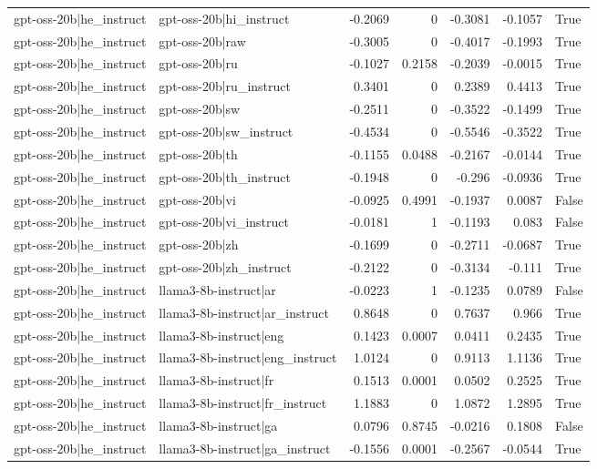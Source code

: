 \begin{table}
\begin{tabular}{l l r r r r l}
gpt-oss-20b|he_instruct & gpt-oss-20b|hi_instruct & -0.2069 & 0 & -0.3081 & -0.1057 & True \\
gpt-oss-20b|he_instruct & gpt-oss-20b|raw & -0.3005 & 0 & -0.4017 & -0.1993 & True \\
gpt-oss-20b|he_instruct & gpt-oss-20b|ru & -0.1027 & 0.2158 & -0.2039 & -0.0015 & True \\
gpt-oss-20b|he_instruct & gpt-oss-20b|ru_instruct & 0.3401 & 0 & 0.2389 & 0.4413 & True \\
gpt-oss-20b|he_instruct & gpt-oss-20b|sw & -0.2511 & 0 & -0.3522 & -0.1499 & True \\
gpt-oss-20b|he_instruct & gpt-oss-20b|sw_instruct & -0.4534 & 0 & -0.5546 & -0.3522 & True \\
gpt-oss-20b|he_instruct & gpt-oss-20b|th & -0.1155 & 0.0488 & -0.2167 & -0.0144 & True \\
gpt-oss-20b|he_instruct & gpt-oss-20b|th_instruct & -0.1948 & 0 & -0.296 & -0.0936 & True \\
gpt-oss-20b|he_instruct & gpt-oss-20b|vi & -0.0925 & 0.4991 & -0.1937 & 0.0087 & False \\
gpt-oss-20b|he_instruct & gpt-oss-20b|vi_instruct & -0.0181 & 1 & -0.1193 & 0.083 & False \\
gpt-oss-20b|he_instruct & gpt-oss-20b|zh & -0.1699 & 0 & -0.2711 & -0.0687 & True \\
gpt-oss-20b|he_instruct & gpt-oss-20b|zh_instruct & -0.2122 & 0 & -0.3134 & -0.111 & True \\
gpt-oss-20b|he_instruct & llama3-8b-instruct|ar & -0.0223 & 1 & -0.1235 & 0.0789 & False \\
gpt-oss-20b|he_instruct & llama3-8b-instruct|ar_instruct & 0.8648 & 0 & 0.7637 & 0.966 & True \\
gpt-oss-20b|he_instruct & llama3-8b-instruct|eng & 0.1423 & 0.0007 & 0.0411 & 0.2435 & True \\
gpt-oss-20b|he_instruct & llama3-8b-instruct|eng_instruct & 1.0124 & 0 & 0.9113 & 1.1136 & True \\
gpt-oss-20b|he_instruct & llama3-8b-instruct|fr & 0.1513 & 0.0001 & 0.0502 & 0.2525 & True \\
gpt-oss-20b|he_instruct & llama3-8b-instruct|fr_instruct & 1.1883 & 0 & 1.0872 & 1.2895 & True \\
gpt-oss-20b|he_instruct & llama3-8b-instruct|ga & 0.0796 & 0.8745 & -0.0216 & 0.1808 & False \\
gpt-oss-20b|he_instruct & llama3-8b-instruct|ga_instruct & -0.1556 & 0.0001 & -0.2567 & -0.0544 & True \\

\end{tabular}
\end{table}

